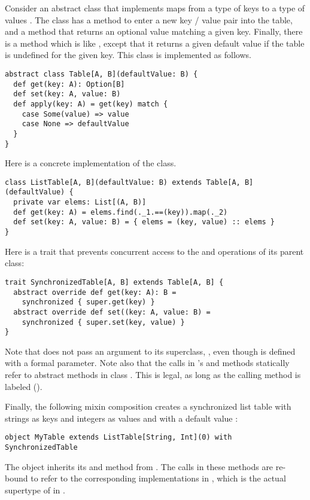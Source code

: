\example Consider an abstract class  that implements maps
from a type of keys  to a type of values . The class
has a method  to enter a new key / value pair into the table,
and a method  that returns an optional value matching a
given key. Finally, there is a method  which is like
, except that it returns a given default value if the table
is undefined for the given key. This class is implemented as follows.
\begin{lstlisting}
abstract class Table[A, B](defaultValue: B) {
  def get(key: A): Option[B]
  def set(key: A, value: B)
  def apply(key: A) = get(key) match {
    case Some(value) => value
    case None => defaultValue
  }
}
\end{lstlisting}
Here is a concrete implementation of the  class.
\begin{lstlisting}
class ListTable[A, B](defaultValue: B) extends Table[A, B](defaultValue) {
  private var elems: List[(A, B)]
  def get(key: A) = elems.find(._1.==(key)).map(._2)
  def set(key: A, value: B) = { elems = (key, value) :: elems }
}
\end{lstlisting}
Here is a trait that prevents concurrent access to the
 and  operations of its parent class:
\begin{lstlisting}
trait SynchronizedTable[A, B] extends Table[A, B] {
  abstract override def get(key: A): B = 
    synchronized { super.get(key) }
  abstract override def set((key: A, value: B) = 
    synchronized { super.set(key, value) }
}

\end{lstlisting}
Note that  does not pass an argument to
its superclass, , even  though  is defined with a
formal parameter. Note also that the  calls
in 's  and  methods
statically refer to abstract methods in class . This is
legal, as long as the calling method is labeled 
 ().

Finally, the following mixin composition creates a synchronized list table
with strings as keys and integers as values and with a default value :
\begin{lstlisting}
object MyTable extends ListTable[String, Int](0) with SynchronizedTable
\end{lstlisting}
The object  inherits its  and 
method from .  The  calls in these
methods are re-bound to refer to the corresponding implementations in
, which is the actual supertype of  
in . 

